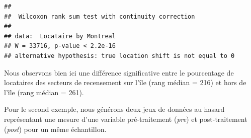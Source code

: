 \documentclass[
  11pt,
  french,
]{book}
\makeatletter
\newenvironment{Shaded}{\begin{snugshade}}{\end{snugshade}}
\newcommand{\CharTok}[1]{\textcolor[rgb]{0.31,0.60,0.02}{#1}}
\newcommand{\CommentTok}[1]{\textcolor[rgb]{0.56,0.35,0.01}{\textit{#1}}}
\newcommand{\DataTypeTok}[1]{\textcolor[rgb]{0.13,0.29,0.53}{#1}}
\newcommand{\DecValTok}[1]{\textcolor[rgb]{0.00,0.00,0.81}{#1}}
\newcommand{\KeywordTok}[1]{\textcolor[rgb]{0.13,0.29,0.53}{\textbf{#1}}}
\newcommand{\NormalTok}[1]{#1}
\newcommand{\OperatorTok}[1]{\textcolor[rgb]{0.81,0.36,0.00}{\textbf{#1}}}
\newcommand{\StringTok}[1]{\textcolor[rgb]{0.31,0.60,0.02}{#1}}
\newenvironment{kframe}{%
\medskip{}
\setlength{\fboxsep}{.8em}
 \def\at@end@of@kframe{}%
 \ifinner\ifhmode%
  \def\at@end@of@kframe{\end{minipage}}%
  \begin{minipage}{\columnwidth}%
 \fi\fi%
 \def\FrameCommand##1{\hskip\@totalleftmargin \hskip-\fboxsep
 \colorbox{shadecolor}{##1}\hskip-\fboxsep
     \hskip-\linewidth \hskip-\@totalleftmargin \hskip\columnwidth}%
 \MakeFramed {\advance\hsize-\width
   \@totalleftmargin\z@ \linewidth\hsize
   \@setminipage}}%
 {\par\unskip\endMakeFramed%
 \at@end@of@kframe}
\renewenvironment{Shaded}{\begin{kframe}}{\end{kframe}}
\makeatother
\begin{document}
\begin{verbatim}
## 
## 	Wilcoxon rank sum test with continuity correction
## 
## data:  Locataire by Montreal
## W = 33716, p-value < 2.2e-16
## alternative hypothesis: true location shift is not equal to 0
\end{verbatim}

Nous observons bien ici une différence significative entre le pourcentage de locataires des secteurs de recensement sur l'île (rang médian = 216) et hors de l'île (rang médian = 261).

Pour le second exemple, nous générons deux jeux de données au hasard représentant une mesure d'une variable pré-traitement (\emph{pre}) et post-traitement (\emph{post}) pour un même échantillon.

\begin{Shaded}
\end{Shaded}
\end{document}
